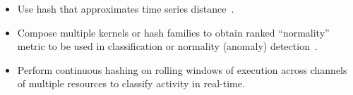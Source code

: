 \documentclass{article}
\begin{document}
\begin{itemize}
    \item Use hash that approximates time series distance~\cite{Hachiya13-NSH,Kale14-KLSH}.
    \item Compose multiple kernels or hash families to obtain ranked ``normality'' metric to be used in classification or normality (anomaly) detection~\cite{Kim16-SLSH}.
    \item Perform continuous hashing on rolling windows of execution across channels of multiple resources to classify activity in real-time.
\end{itemize}



\end{document}
